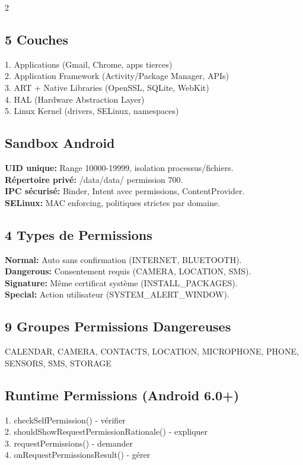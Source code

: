 \documentclass[9pt,a4paper]{extarticle}
\begin{document}
\begin{multicols}{2}
\subsection*{5 Couches}
1. Applications (Gmail, Chrome, apps tierces)\\
2. Application Framework (Activity/Package Manager, APIs)\\
3. ART + Native Libraries (OpenSSL, SQLite, WebKit)\\
4. HAL (Hardware Abstraction Layer)\\
5. Linux Kernel (drivers, SELinux, namespaces)

\subsection*{Sandbox Android}
\textbf{UID unique:} Range 10000-19999, isolation processus/fichiers.\\
\textbf{Répertoire privé:} /data/data/ permission 700.\\
\textbf{IPC sécurisé:} Binder, Intent avec permissions, ContentProvider.\\
\textbf{SELinux:} MAC enforcing, politiques strictes par domaine.

\subsection*{4 Types de Permissions}
\textbf{Normal:} Auto sans confirmation (INTERNET, BLUETOOTH).\\
\textbf{Dangerous:} Consentement requis (CAMERA, LOCATION, SMS).\\
\textbf{Signature:} Même certificat système (INSTALL\_PACKAGES).\\
\textbf{Special:} Action utilisateur (SYSTEM\_ALERT\_WINDOW).

\subsection*{9 Groupes Permissions Dangereuses}
CALENDAR, CAMERA, CONTACTS, LOCATION, MICROPHONE, PHONE, SENSORS, SMS, STORAGE

\subsection*{Runtime Permissions (Android 6.0+)}
1. checkSelfPermission() - vérifier\\
2. shouldShowRequestPermissionRationale() - expliquer\\
3. requestPermissions() - demander\\
4. onRequestPermissionsResult() - gérer


\end{multicols}
\end{document}
